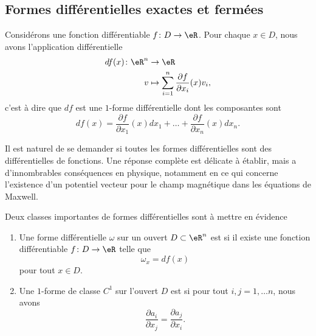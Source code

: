 \subsection{Formes différentielles exactes et fermées}

Considérons une fonction différentiable $f\colon D\to \eR$. Pour chaque $x\in D$, nous avons l'application différentielle
\begin{equation}
	\begin{aligned}
		df(x)\colon \eR^n&\to \eR \\
		v&\mapsto \sum_{i=1}^n\frac{ \partial f }{ \partial x_i }(x)v_i, 
	\end{aligned}
\end{equation}
c'est à dire que $df$ est une $1$-forme différentielle dont les composantes sont
\begin{equation}
	df(x)=\frac{ \partial f }{ \partial x_1 }(x)dx_1+\ldots+\frac{ \partial f }{ \partial x_n }(x)dx_n.
\end{equation}

Il est naturel de se demander si toutes les formes différentielles sont des différentielles de fonctions. Une réponse complète est délicate à établir, mais a d'innombrables conséquences en physique, notamment en ce qui concerne l'existence d'un potentiel vecteur pour le champ magnétique dans les équations de Maxwell.
\begin{definition}
	Deux classes importantes de formes différentielles sont à mettre en évidence
	\begin{enumerate}
		\item
			Une forme différentielle $\omega$ sur un ouvert $D\subset\eR^n$ est  si il existe une fonction différentiable $f\colon D\to \eR$ telle que
			\begin{equation}
				 \omega_x=df(x)
			\end{equation}
			pour tout $x\in D$.
		\item
			Une $1$-forme de classe $C^1$ sur l'ouvert $D$ est  si pour tout $i,j=1,\ldots n$, nous avons
			\begin{equation}
				\frac{ \partial a_i }{ \partial x_j }=\frac{ \partial a_j }{ \partial x_i }.
			\end{equation}
	\end{enumerate}
\end{definition}

